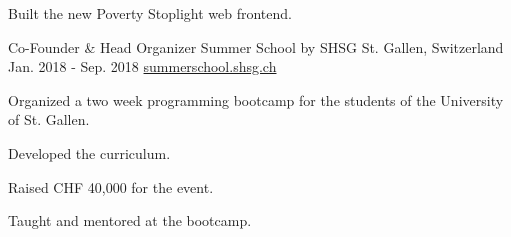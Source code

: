 \begin{cventries}
{\begin{cvitems}
      \item {Built the new Poverty Stoplight web frontend.}
      \end{cvitems}
    }
  \cventry
    {Co-Founder \& Head Organizer} %
    {Summer School by SHSG} %
    {St. Gallen, Switzerland} %
    {Jan. 2018 - Sep. 2018} %
    {\href{https://summerschool.shsg.ch}{summerschool.shsg.ch}} %
    {
      \begin{cvitems} %
      \item {Organized a two week programming bootcamp for the students of the University of St. Gallen.}
      \item {Developed the curriculum.}
      \item {Raised CHF 40,000 for the event.}
      \item {Taught and mentored at the bootcamp.}
      \end{cvitems}
    }


\end{cventries}
